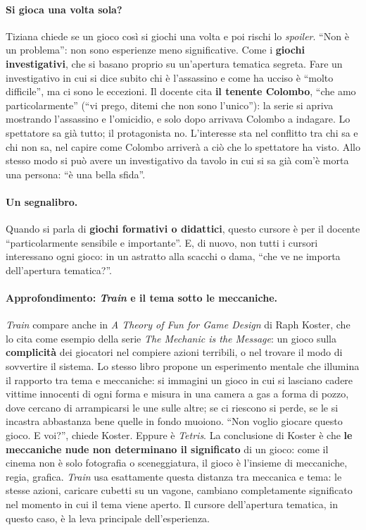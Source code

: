 \paragraph{Si gioca una volta sola?} Tiziana chiede se un gioco così si giochi
una volta e poi rischi lo \emph{spoiler}. ``Non è un problema'': non sono
esperienze meno significative. Come i \textbf{giochi investigativi}, che si
basano proprio su un'apertura tematica segreta. Fare un investigativo in cui si
dice subito chi è l'assassino e come ha ucciso è ``molto difficile'', ma ci sono
le eccezioni. Il docente cita \textbf{il tenente Colombo}, ``che amo
particolarmente'' (``vi prego, ditemi che non sono l'unico''): la serie si apriva
mostrando l'assassino e l'omicidio, e solo dopo arrivava Colombo a indagare. Lo
spettatore sa già tutto; il protagonista no. L'interesse sta nel conflitto tra
chi sa e chi non sa, nel capire come Colombo arriverà a ciò che lo spettatore ha
visto. Allo stesso modo si può avere un investigativo da tavolo in cui si sa già
com'è morta una persona: ``è una bella sfida''.

\paragraph{Un segnalibro.} Quando si parla di \textbf{giochi formativi o
didattici}, questo cursore è per il docente ``particolarmente sensibile e
importante''. E, di nuovo, non tutti i cursori interessano ogni gioco: in un
astratto alla scacchi o dama, ``che ve ne importa dell'apertura tematica?''.

\paragraph{Approfondimento: \emph{Train} e il tema sotto le meccaniche.}
\emph{Train} compare anche in \emph{A Theory of Fun for Game Design} di Raph
Koster, che lo cita come esempio della serie \emph{The Mechanic is the Message}:
un gioco sulla \textbf{complicità} dei giocatori nel compiere azioni terribili,
o nel trovare il modo di sovvertire il sistema. Lo stesso libro propone un
esperimento mentale che illumina il rapporto tra tema e meccaniche: si immagini
un gioco in cui si lasciano cadere vittime innocenti di ogni forma e misura in
una camera a gas a forma di pozzo, dove cercano di arrampicarsi le une sulle
altre; se ci riescono si perde, se le si incastra abbastanza bene quelle in
fondo muoiono. ``Non voglio giocare questo gioco. E voi?'', chiede Koster. Eppure
è \emph{Tetris}. La conclusione di Koster è che \textbf{le meccaniche nude non
determinano il significato} di un gioco: come il cinema non è solo fotografia o
sceneggiatura, il gioco è l'insieme di meccaniche, regia, grafica. \emph{Train}
usa esattamente questa distanza tra meccanica e tema: le stesse azioni,
caricare cubetti su un vagone, cambiano completamente significato nel momento in
cui il tema viene aperto. Il cursore dell'apertura tematica, in questo caso, è
la leva principale dell'esperienza.

